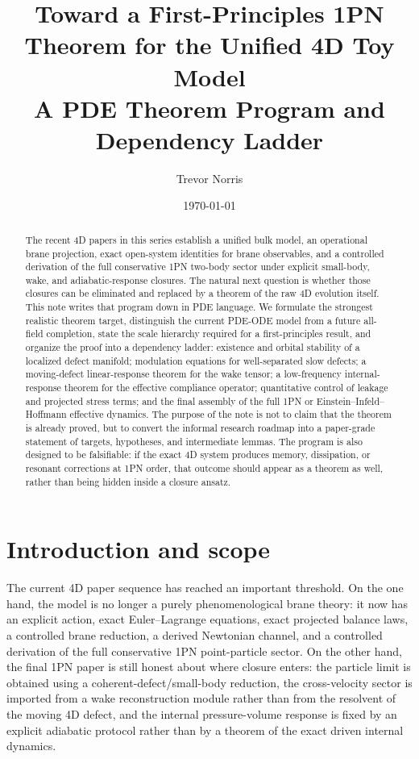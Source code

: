 \documentclass[11pt]{article}
\title{Toward a First-Principles 1PN Theorem for the Unified 4D Toy Model\\
A PDE Theorem Program and Dependency Ladder}
\author{Trevor Norris}
\date{\today}
\begin{document}
\maketitle

\begin{abstract}
The recent 4D papers in this series establish a unified bulk model, an operational brane projection, exact open-system identities for brane observables, and a controlled derivation of the full conservative 1PN two-body sector under explicit small-body, wake, and adiabatic-response closures. The natural next question is whether those closures can be eliminated and replaced by a theorem of the raw 4D evolution itself. This note writes that program down in PDE language. We formulate the strongest realistic theorem target, distinguish the current PDE-ODE model from a future all-field completion, state the scale hierarchy required for a first-principles result, and organize the proof into a dependency ladder: existence and orbital stability of a localized defect manifold; modulation equations for well-separated slow defects; a moving-defect linear-response theorem for the wake tensor; a low-frequency internal-response theorem for the effective compliance operator; quantitative control of leakage and projected stress terms; and the final assembly of the full 1PN or Einstein--Infeld--Hoffmann effective dynamics. The purpose of the note is not to claim that the theorem is already proved, but to convert the informal research roadmap into a paper-grade statement of targets, hypotheses, and intermediate lemmas. The program is also designed to be falsifiable: if the exact 4D system produces memory, dissipation, or resonant corrections at 1PN order, that outcome should appear as a theorem as well, rather than being hidden inside a closure ansatz.
\end{abstract}

\section{Introduction and scope}
\label{sec:intro}

The current 4D paper sequence has reached an important threshold. On the one hand, the model is no longer a purely phenomenological brane theory: it now has an explicit action, exact Euler--Lagrange equations, exact projected balance laws, a controlled brane reduction, a derived Newtonian channel, and a controlled derivation of the full conservative 1PN point-particle sector. On the other hand, the final 1PN paper is still honest about where closure enters: the particle limit is obtained using a coherent-defect/small-body reduction, the cross-velocity sector is imported from a wake reconstruction module rather than from the resolvent of the moving 4D defect, and the internal pressure-volume response is fixed by an explicit adiabatic protocol rather than by a theorem of the exact driven internal dynamics.
\end{document}
